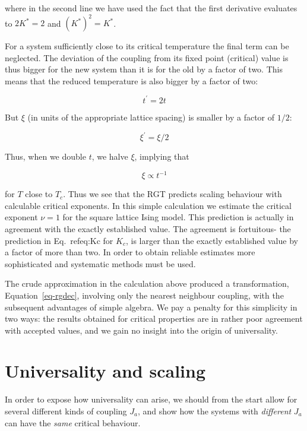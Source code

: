 \documentclass[
  letterpaper,
  enabledeprecatedfontcommands]{report}
\begin{document}
where in the second line we have used the fact that the first derivative
evaluates to \(2K^*=2\) and \((K^*)^2=K^*\).

For a system sufficiently close to its critical temperature the final
term can be neglected. The deviation of the coupling from its fixed
point (critical) value is thus bigger for the new system than it is for
the old by a factor of two. This means that the reduced temperature is
also bigger by a factor of two:

\[t^\prime= 2t\]

But \(\xi\) (in units of the appropriate lattice spacing) is smaller by
a factor of \(1/2\):

\[\xi^\prime= \xi/2\]

Thus, when we double \(t\), we halve \(\xi\), implying that

\[\xi\propto t^{-1}\]

for \(T\) close to \(T_c\). Thus we see that the RGT predicts scaling
behaviour with calculable critical exponents. In this simple calculation
we estimate the critical exponent \(\nu=1\) for the square lattice Ising
model. This prediction is actually in agreement with the exactly
established value. The agreement is fortuitous- the prediction in
Eq.~refeq:Kc for \(K_c\), is larger than the exactly established value
by a factor of more than two. In order to obtain reliable estimates more
sophisticated and systematic methods must be used.

The crude approximation in the calculation above produced a
transformation, Equation~\ref{eq-rgdec}, involving only the nearest
neighbour coupling, with the subsequent advantages of simple algebra. We
pay a penalty for this simplicity in two ways: the results obtained for
critical properties are in rather poor agreement with accepted values,
and we gain no insight into the origin of universality.

\section{Universality and scaling}\label{universality-and-scaling-2}

In order to expose how universality can arise, we should from the start
allow for several different kinds of coupling \(J_a\), and show how the
systems with \emph{different} \(J_a\) can have the \emph{same} critical
behaviour.
\end{document}

